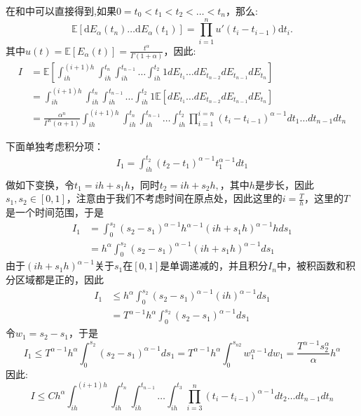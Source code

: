 \documentclass[12pt,final]{article}
\makeatletter
\numberwithin{equation}{section}
\numberwithin{figure}{section}
\numberwithin{table}{section}
\theoremstyle{plain}
\renewcommand{\proofname}{proof}
\theoremstyle{definition}
\theoremstyle{remark}
\renewenvironment{proof}[1][\proofname]{\par
  \pushQED{\qed}%
  \normalfont \topsep6\p@\@plus6\p@\relax
  \trivlist\item[\hskip\labelsep
  \bfseries #1\@addpunct{\,:\,}]\ignorespaces
}{%
  \popQED\endtrivlist\@endpefalse
}
\makeatother
\begin{document}
\begin{proof}    
	在\cite{daley2003introduction}和\cite{magdziarz2009stochastic}中可以直接得到,如果$0 = t_0 < t_1 < t_2 < \ldots <t_n$，那么:
	\begin{equation*}
		\mathbb{E}[\mathrm dE_\alpha(t_n)\ldots\mathrm dE_\alpha(t_1)]=\prod_{i=1}^nu'(t_i-t_{i-1})\mathrm dt_i.
	\end{equation*}
	其中$u(t)=\mathbb{E}[E_\alpha(t)]=\frac{t^\alpha}{\Gamma(1+\alpha)}$，因此:
	\begin{align*}
		I &= \mathbb{E}\left[\int_{ih}^{(i+1)h}
		\int_{ih}^{t_n}\int_{ih}^{t_{n-1}} \ldots \int_{ih}^{t_{2}} 1 dE_{t_1} \ldots dE_{t_{n-2}}dE_{t_{n-1}}dE_{t_n}\right] \\
		& = \int_{ih}^{(i+1)h}\int_{ih}^{t_n}\int_{ih}^{t_{n-1}}
		\ldots \int_{ih}^{t_{2}} 1 \mathbb{E}\left[dE_{t_1} \ldots dE_{t_{n-2}}dE_{t_{n-1}}dE_{t_n}\right] \\
		& = \frac{\alpha^n}{\Gamma^n(\alpha+1)}
		\int_{ih}^{(i+1)h}\int_{ih}^{t_n}\int_{ih}^{t_{n-1}} \ldots \int_{ih}^{t_{2}} \prod_{i=1}^{i=n}(t_i-t_{i-1})^{\alpha -1} dt_1 \ldots dt_{n-1}dt_n
	\end{align*}
	
	下面单独考虑积分项：
	\begin{align*}
		I_{1}=\int_{ih}^{t_{2}} (t_{2}-t_1)^{\alpha -1} t_1^{\alpha - 1} dt_1 \\
	\end{align*}
	做如下变换，令$t_{1} = ih + s_{1}h$，同时$t_2 = ih + s_2h ,$，其中$h$是步长，因此$s_1,s_{2} \in [0,1]$，注意由于我们不考虑时间在原点处，因此这里的$i=\frac{T}{h}$，这里的$T$是一个时间范围，于是
	\begin{align*}
		I_1 &= \int_{0}^{s_{2}} (s_{2}-s_{1})^{\alpha -1}h^{\alpha -1} (ih + s_1h)^{\alpha - 1}h ds_1 \\
		&= h^{\alpha}\int_{0}^{s_{2}} (s_{2}-s_{1})^{\alpha -1} (ih + s_1h)^{\alpha - 1} ds_1
	\end{align*}
	由于$(ih + s_1h)^{\alpha - 1}$关于$s_1$在$[0,1]$是单调递减的，并且积分$I_n$中，被积函数和积分区域都是正的，因此
	\begin{align*}
		I_1 &\le h^{\alpha}\int_{0}^{s_{2}} (s_{2}-s_{1})^{\alpha -1} (ih)^{\alpha - 1} ds_1 \\
		&=  T^{\alpha - 1}h^{\alpha}\int_{0}^{s_{2}} (s_{2}-s_{1})^{\alpha -1} ds_1
	\end{align*}
	令$w_1=s_{2}-s_{1}$，于是
	\begin{equation*}
		I_1\le T^{\alpha - 1}h^{\alpha}\int_{0}^{s_{2}} (s_{2}-s_{1})^{\alpha -1} ds_1
		=  T^{\alpha - 1}h^{\alpha}\int_{0}^{s_{n2}} w_1^{\alpha -1} dw_1
		=  \frac{T^{\alpha - 1}s_{2}^\alpha}{\alpha}h^{\alpha}
	\end{equation*}
	因此:
	\begin{equation*}
		I \le Ch^\alpha
		\int_{ih}^{(i+1)h}\int_{ih}^{t_n}\int_{ih}^{t_{n-1}} \ldots \int_{ih}^{t_{3}} 
		\prod_{i=3}^{n}(t_i-t_{i-1})^{\alpha -1} dt_{2} \ldots dt_{n-1}dt_n
	\end{equation*}
	

\end{proof}
\end{document}
